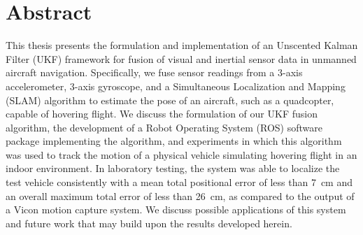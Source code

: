 \chapter*{Abstract}

This thesis presents the formulation and implementation of an Unscented Kalman Filter (UKF) framework for fusion of visual and inertial sensor data in unmanned aircraft navigation. Specifically, we fuse sensor readings from a 3-axis accelerometer, 3-axis gyroscope, and a Simultaneous Localization and Mapping (SLAM) algorithm to estimate the pose of an aircraft, such as a quadcopter, capable of hovering flight. We discuss the formulation of our UKF fusion algorithm, the development of a Robot Operating System (ROS) software package implementing the algorithm, and experiments in which this algorithm was used to track the motion of a physical vehicle simulating hovering flight in an indoor environment. In laboratory testing, the system was able to localize the test vehicle consistently with a mean total positional error of less than 7~cm and an overall maximum total error of less than 26~cm, as compared to the output of a Vicon motion capture system. We discuss possible applications of this system and future work that may build upon the results developed herein.